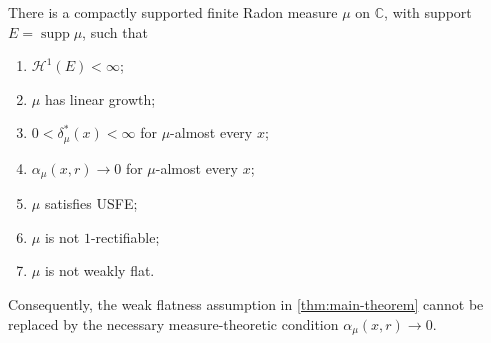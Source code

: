 \documentclass[11pt,a4paper,english,reqno]{amsart}
\newcommand{\hd}[1]{\mathcal{H}^{#1}}
\numberwithin{equation}{section}
\newcommand{\CC}[0]{\mathbb{C}}
\DeclareMathOperator{\supp}{supp}
\numberwithin{definition}{section}
\begin{document}
\begin{theorem}\label{thm:alpha-usfe-counterexample}\label{thm:finite-support-counterexample}
  There is a compactly supported finite Radon measure $\mu$ on $\CC$, with support $E=\supp\mu$, such that
  \begin{enumerate}
    \item $\hd1(E)<\infty$;
    \item $\mu$ has linear growth;
    \item $0<\delta_\mu^*(x)<\infty$ for $\mu$-almost every $x$;
    \item $\alpha_{\mu}(x,r)\to0$ for $\mu$-almost every $x$;
    \item $\mu$ satisfies USFE;
    \item $\mu$ is not $1$-rectifiable;
    \item $\mu$ is not weakly flat.
  \end{enumerate}
  Consequently, the weak flatness assumption in \cref{thm:main-theorem} cannot be replaced by the necessary measure-theoretic condition $\alpha_{\mu}(x,r)\to0$.
\end{theorem}
\end{document}
